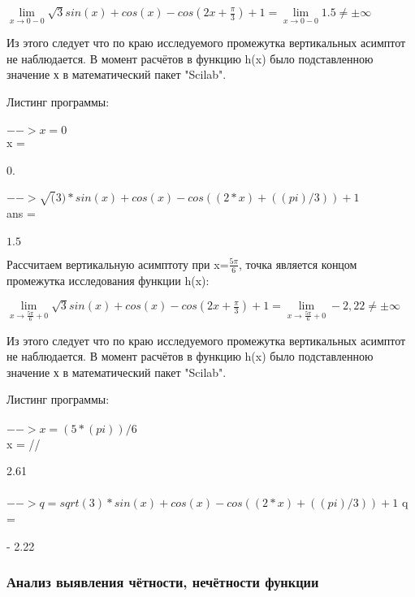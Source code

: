 \documentclass[russian,utf8,nocolumnxxxi,nocolumnxxxii]{eskdtext}
\begin{document}
\begin{center}

$\lim\limits_{x\to{0-0}}\sqrt{3}sin(x)+cos(x)-cos(2x+\frac{\pi}{3})+1=\lim\limits_{x\to{0-0}}1.5\neq\pm\infty$

\end{center}

Из этого следует что по краю исследуемого промежутка вертикальных асимптот не наблюдается.
В момент расчётов в функцию h(x) было подставленною значение х в математический пакет "Scilab".

Листинг программы:
\\
\\$-->x=0$
\\ x  =
\\

\\$0.$
\\
\\$-->\sqrt(3)*sin(x)+cos(x)-cos((2*x) + ((pi)/3))+1$
\\ ans  =
\\

\\$1.5$

Рассчитаем вертикальную асимптоту при x=$\frac{5\pi}{6}$, точка является концом промежутка исследования функции h(x):

\begin{center}

$\lim\limits_{x\to{\frac{5\pi}{6}+0}}\sqrt{3}sin(x)+cos(x)-cos(2x+\frac{\pi}{3})+1=\lim\limits_{x\to{\frac{5\pi}{6}+0}}-2,22\neq\pm\infty$

\end{center}

Из этого следует что по краю исследуемого промежутка вертикальных асимптот не наблюдается.
В момент расчётов в функцию h(x) было подставленною значение х в математический пакет "Scilab".

Листинг программы:
\\
\\$-->x=(5*(pi))/6$
\\ x  =
//

 2.61
\\
\\$-->q=sqrt(3)*sin(x)+cos(x)-cos((2*x) + ((pi)/3))+1$
q  =

- 2.22

\subsubsection{Анализ выявления чётности, нечётности функции}
\end{document}
